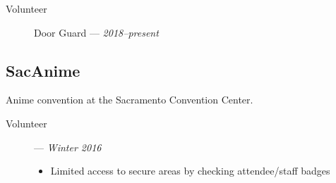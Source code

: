 \documentclass[10pt]{article}
\begin{document}
\begin{description}
  \item[Volunteer] Door Guard --- \textit{2018--present}
\end{description}

\subsection*{SacAnime}
Anime convention at the Sacramento Convention Center.

\begin{description}
  \item[Volunteer] --- \textit{Winter 2016}
    \begin{itemize}
      \item Limited access to secure areas by checking attendee/staff badges
    \end{itemize}
\end{description}
\end{document}
